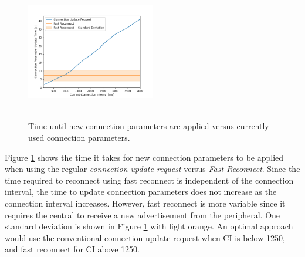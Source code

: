 \begin{figure}[]
    \centering
    \includegraphics[width=0.5\textwidth,height=6cm,keepaspectratio=true]{plots/static_conn_update_plot.png}
    \caption{
        Time until new connection parameters are applied versus currently used connection parameters.
    }
    \label{fig:static_conn_update_time}
\end{figure}

Figure \ref{fig:static_conn_update_time} shows the time it takes for new connection parameters to be applied when using the regular \textit{connection update request} versus \textit{Fast Reconnect}. Since the time required to reconnect using fast reconnect is independent of the connection interval, the time to update connection parameters does not increase as the connection interval increases. However, fast reconnect is more variable since it requires the central to receive a new advertisement from the peripheral. One standard deviation is shown in Figure \ref{fig:static_conn_update_time} with light orange. An optimal approach would use the conventional connection update request when CI is below 1250, and fast reconnect for CI above 1250.

